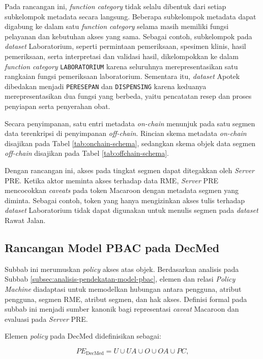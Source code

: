 \documentclass[bahasa, 12pt, a4paper, onecolumn, oneside, final]{report}
\begin{document}
Pada rancangan ini, \textit{function category} tidak selalu dibentuk dari setiap subkelompok metadata secara langsung. Beberapa subkelompok metadata dapat digabung ke dalam satu \textit{function category} selama masih memiliki fungsi pelayanan dan kebutuhan akses yang sama. Sebagai contoh, subkelompok pada \textit{dataset} Laboratorium, seperti permintaan pemeriksaan, spesimen klinis, hasil pemeriksaan, serta interpretasi dan validasi hasil, dikelompokkan ke dalam \textit{function category} \texttt{LABORATORIUM} karena seluruhnya merepresentasikan satu rangkaian fungsi pemeriksaan laboratorium. Sementara itu, \textit{dataset} Apotek dibedakan menjadi \texttt{PERESEPAN} dan \texttt{DISPENSING} karena keduanya merepresentasikan dua fungsi yang berbeda, yaitu pencatatan resep dan proses penyiapan serta penyerahan obat.

Secara penyimpanan, satu entri metadata \textit{on-chain} menunjuk pada satu segmen data terenkripsi di penyimpanan \textit{off-chain}. Rincian skema metadata \textit{on-chain} disajikan pada Tabel \ref{tab:onchain-schema}, sedangkan skema objek data segmen \textit{off-chain} disajikan pada Tabel \ref{tab:offchain-schema}.

Dengan rancangan ini, akses pada tingkat segmen dapat ditegakkan oleh \textit{Server} PRE. Ketika aktor meminta akses terhadap data RME, \textit{Server} PRE mencocokkan \textit{caveats} pada token Macaroon dengan metadata segmen yang diminta. Sebagai contoh, token yang hanya mengizinkan akses tulis terhadap \textit{dataset} Laboratorium tidak dapat digunakan untuk menulis segmen pada \textit{dataset} Rawat Jalan.
\subsection{Rancangan Model PBAC pada DecMed}
\label{subsec:rancangan-model-pbac-decmed}

Subbab ini merumuskan \textit{policy} akses atas objek. Berdasarkan analisis pada Subbab \ref{subsec:analisis-pendekatan-model-pbac}, elemen dan relasi \textit{Policy Machine} diadaptasi untuk memodelkan hubungan antara pengguna, atribut pengguna, segmen RME, atribut segmen, dan hak akses. Definisi formal pada subbab ini menjadi sumber kanonik bagi representasi \textit{caveat} Macaroon dan evaluasi pada \textit{Server} PRE.

Elemen \textit{policy} pada DecMed didefinisikan sebagai:

\begin{equation}
	PE_{\text{DecMed}}
	=
	U \cup UA \cup O \cup OA \cup PC,
\end{equation}
\end{document}

